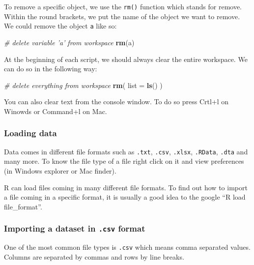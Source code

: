 \documentclass[]{article}
\newenvironment{Shaded}{\begin{snugshade}}{\end{snugshade}}
\newcommand{\CommentTok}[1]{\textcolor[rgb]{0.56,0.35,0.01}{\textit{#1}}}
\newcommand{\DataTypeTok}[1]{\textcolor[rgb]{0.13,0.29,0.53}{#1}}
\newcommand{\KeywordTok}[1]{\textcolor[rgb]{0.13,0.29,0.53}{\textbf{#1}}}
\newcommand{\NormalTok}[1]{#1}
\begin{document}
To remove a specific object, we use the \texttt{rm()} function which stands for remove. Within the round brackets, we put the name of the object we want to remove. We could remove the object \texttt{a} like so:

\begin{Shaded}
\begin{Highlighting}[]
\CommentTok{# delete variable 'a' from workspace}
\KeywordTok{rm}\NormalTok{(a)}
\end{Highlighting}
\end{Shaded}

At the beginning of each script, we should always clear the entire workspace. We can do so in the following way:

\begin{Shaded}
\begin{Highlighting}[]
\CommentTok{# delete everything from workspace}
\KeywordTok{rm}\NormalTok{( }\DataTypeTok{list =} \KeywordTok{ls}\NormalTok{() )}
\end{Highlighting}
\end{Shaded}

You can also clear text from the console window. To do so press Crtl+l on Winowds or Command+l on Mac.

\hypertarget{loading-data}{%
\subsubsection{Loading data}\label{loading-data}}

Data comes in different file formats such as \texttt{.txt}, \texttt{.csv}, \texttt{.xlsx}, \texttt{.RData}, \texttt{.dta} and many more. To know the file type of a file right click on it and view preferences (in Windows explorer or Mac finder).

R can load files coming in many different file formats. To find out how to import a file coming in a specific format, it is usually a good idea to the google ``R load file\_format''.

\hypertarget{importing-a-dataset-in-.csv-format}{%
\subsubsection{\texorpdfstring{Importing a dataset in \texttt{.csv} format}{Importing a dataset in .csv format}}\label{importing-a-dataset-in-.csv-format}}

One of the most common file types is \texttt{.csv} which means comma separated values. Columns are separated by commas and rows by line breaks.
\end{document}
